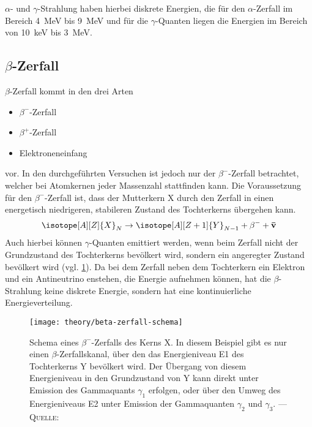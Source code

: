 \documentclass[../protokoll.tex]{subfiles}
\begin{document}
$\alpha$- und $\gamma$-Strahlung haben hierbei diskrete Energien, die für den
$\alpha$-Zerfall im Bereich \qty{4}{\mega\electronvolt} bis 
\qty{9}{\mega\electronvolt} und für die $\gamma$-Quanten liegen die Energien
im Bereich von \qty{10}{\kilo\electronvolt} bis \qty{3}{\mega\electronvolt}.

\subsection{\texorpdfstring{$\beta$}{Beta}-Zerfall}
$\beta$-Zerfall kommt in den drei Arten
\begin{itemize}[noitemsep, nosep]
    \item $\beta^-$-Zerfall
    \item $\beta^+$-Zerfall
    \item Elektroneneinfang
\end{itemize}
vor. In den durchgeführten Versuchen ist jedoch nur der $\beta^-$-Zerfall 
betrachtet, welcher bei Atomkernen jeder Massenzahl stattfinden kann. Die
Voraussetzung für den $\beta^-$-Zerfall ist, dass der Mutterkern X durch den
Zerfall in einen energetisch niedrigeren, stabileren Zustand des Tochterkerns
übergehen kann.
\begin{equation*}
    \isotope[A][Z]{X}_N \to \isotope[A][Z+1]{Y}_{N-1} + \beta^- + \mathbf{\bar{v}}
\end{equation*}
Auch hierbei können $\gamma$-Quanten emittiert werden, wenn beim Zerfall nicht
der Grundzustand des Tochterkerns bevölkert wird, sondern ein angeregter Zustand
bevölkert wird (vgl. \cref{fig:Schema Beta-Zerfall}). Da bei dem Zerfall neben
dem Tochterkern ein Elektron und ein Antineutrino enstehen, die Energie
aufnehmen können, hat die $\beta$-Strahlung keine diskrete Energie, sondern hat
eine kontinuierliche Energieverteilung.

\begin{figure}[H]
    \centering
    \texttt{[image: theory/beta-zerfall-schema]}
    \caption{Schema eines $\beta^-$-Zerfalls des Kerns X. In diesem Beispiel 
    gibt es nur einen $\beta$-Zerfallskanal, über den das Energieniveau E1 des 
    Tochterkerns Y bevölkert wird. Der Übergang von diesem Energieniveau in den 
    Grundzustand von Y kann direkt unter Emission des Gammaquants $\gamma_1$
    erfolgen, oder über den Umweg des Energieniveaus E2 unter
    Emission der Gammaquanten $\gamma_2$ und $\gamma_3$. --- 
    \textsc{Quelle:} \cite[S. 31, Abb. 2]{script}}
    \label{fig:Schema Beta-Zerfall}
\end{figure}
\end{document}
